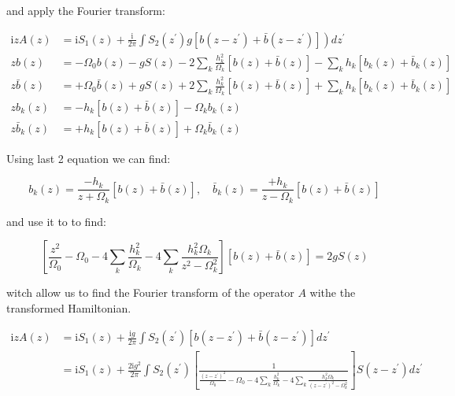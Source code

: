 \documentclass[%
preprint,
onecolumn,
notitlepag,
 amsmath,amssymb,
 aps,
 pra,
]{revtex4-2}
\begin{document}
and apply the Fourier transform: 

\begin{equation}
\begin{aligned}
 \mathrm{i} z A(z) &\left.= \mathrm{i} S_{1}(z)+\frac{\mathrm{i} }{2 \pi} \int S_{2}\left(z^{\prime}\right) g\left[b\left(z-z^{\prime}\right)+\bar{b}\left(z-z^{\prime}\right)\right]\right) d z^{\prime} \\
z b(z) &=-\Omega_{0} b(z)-g S(z)-2 \sum_{k} \frac{h_{k}^{2}}{\Omega_{k}}[b(z)+\bar{b}(z)]-\sum_{k} h_{k}\left[b_{k}(z)+\bar{b}_{k}(z)\right] \\
z \bar{b}(z) &=+\Omega_{0} \bar{b}(z)+g S(z)+2 \sum_{k} \frac{h_{k}^{2}}{\Omega_{k}}[b(z)+\bar{b}(z)]+\sum_{k} h_{k}\left[b_{k}(z)+\bar{b}_{k}(z)\right] \\
z b_{k}(z) &=-h_{k}[b(z)+\bar{b}(z)]-\Omega_{k} b_{k}(z) \\
z \bar{b}_{k}(z) &=+h_{k}[b(z)+\bar{b}(z)]+\Omega_{k} \bar{b}_{k}(z)
\end{aligned}
\end{equation}

Using last 2 equation we can find:

\begin{equation}
b_{k}(z)=\frac{-h_{k}}{z+\Omega_{k}}[b(z)+\bar{b}(z)], \quad \bar{b}_{k}(z)=\frac{+h_{k}}{z-\Omega_{k}}[b(z)+\bar{b}(z)]
\end{equation}


and use it to to find: 


\begin{equation}
\left[\frac{z^{2}}{\Omega_{0}}-\Omega_{0}-4 \sum_{k} \frac{h_{k}^{2}}{\Omega_{k}}-4 \sum_{k} \frac{h_{k}^{2} \Omega_{k}}{z^{2}-\Omega_{k}^{2}}\right][b(z)+\bar{b}(z)]=2 g S(z)
\end{equation}


witch allow us to find the Fourier transform of the operator $A$ withe the transformed Hamiltonian. 

\begin{equation}
\begin{aligned}
 \mathrm{i} z A(z) &=\mathrm{i} S_{1}(z)+\frac{\mathrm{i} g}{2 \pi} \int S_{2}\left(z^{\prime}\right)\left[b\left(z-z^{\prime}\right)+\bar{b}\left(z-z^{\prime}\right)\right] d z^{\prime} \\
&=\mathrm{i}  S_{1}(z)+\frac{2 \mathrm{i} g^{2}}{2 \pi} \int S_{2}\left(z^{\prime}\right)\left[\frac{1}{\frac{\left(z-z^{\prime}\right)^{2}}{\Omega_{0}}-\Omega_{0}-4 \sum_{k} \frac{h_{k}^{2}}{\Omega_{k}}-4 \sum_{k} \frac{h_{k}^{2} \Omega_{k}}{\left(z-z^{\prime}\right)^{2}-\Omega_{k}^{2}}}\right] S\left(z-z^{\prime}\right) d z^{\prime}
\end{aligned}
\label{evolution operator FT final_rc}
\end{equation}
\end{document}

